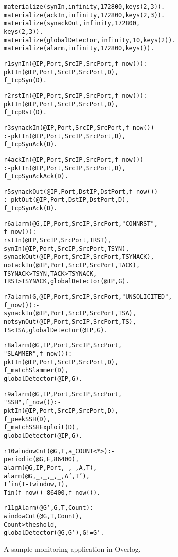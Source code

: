\documentclass[10pt,twocolumn]{MyTightStyle}
\newenvironment{overlog}{\begin{alltt}\footnotesize}{\end{alltt}}
\begin{document}
\begin{figure} 
\begin{overlog}

materialize(synIn, infinity, 172800, keys(2,3)).
materialize(ackIn, infinity, 172800, keys(2,3)).
materialize(synackOut, infinity, 172800,
   keys(2,3)).
materialize(globalDetector, infinity, 10, keys(2)).
materialize(alarm, infinity, 172800, keys()).

r1 synIn(@IP, Port, SrcIP, SrcPort, f_now()) :-
   pktIn(@IP, Port, SrcIP, SrcPort, D),
   f_tcpSyn(D).

r2 rstIn(@IP, Port, SrcIP, SrcPort, f_now()) :-
   pktIn(@IP, Port, SrcIP, SrcPort, D),
   f_tcpRst(D).

r3 synackIn(@IP, Port, SrcIP, SrcPort, f_now())
   :- pktIn(@IP, Port, SrcIP, SrcPort, D),
   f_tcpSynAck(D).

r4 ackIn(@IP, Port, SrcIP, SrcPort, f_now())
   :- pktIn(@IP, Port, SrcIP, SrcPort, D),
   f_tcpSynAckAck(D).

r5 synackOut(@IP, Port, DstIP, DstPort, f_now())
   :- pktOut(@IP, Port, DstIP, DstPort, D),
   f_tcpSynAck(D).

r6 alarm(@G, IP, Port, SrcIP, SrcPort, "CONNRST",
   f_now()) :-
   rstIn(@IP, SrcIP, SrcPort, TRST),
   synIn(@IP, Port, SrcIP, SrcPort, TSYN),
   synackOut(@IP, Port, SrcIP, SrcPort, TSYNACK),
   not ackIn(@IP, Port, SrcIP, SrcPort, TACK),
   TSYNACK > TSYN, TACK > TSYNACK,
   TRST > TSYNACK, globalDetector(@IP, G).

r7 alarm(G, @IP, Port, SrcIP, SrcPort, "UNSOLICITED",
   f_now()) :-
   synackIn(@IP, Port, SrcIP, SrcPort, TSA),
   not synOut(@IP, Port, SrcIP, SrcPort, TS),
   TS < TSA, globalDetector(@IP, G).

r8 alarm(@G, IP, Port, SrcIP, SrcPort,
   "SLAMMER", f_now()) :-
   pktIn(@IP, Port, SrcIP, SrcPort, D),
   f_matchSlammer(D),
   globalDetector(@IP, G).

r9 alarm(@G, IP, Port, SrcIP, SrcPort,
   "SSH", f_now()) :-
   pktIn(@IP, Port, SrcIP, SrcPort, D),
   f_peekSSH(D),
   f_matchSSHExploit(D),
   globalDetector(@IP, G).

r10 windowCnt(@G, T, a_COUNT<*>) :-
   periodic(@G, E, 86400),
   alarm(@G, IP, Port, _, _, A, T),
   alarm(@G, _, _, _, _, A', T'),
   T' in (T - twindow, T),
   T in (f_now() - 86400, f_now()).

r11 gAlarm(@G', G, T, Count) :-
   windowCnt(@G, T, Count),
   Count > theshold,
   globalDetector(@G, G'), G != G'.
\end{overlog}
\caption{A sample monitoring application in Overlog.} 
\label{example} 
\end{figure} 
\end{document}
